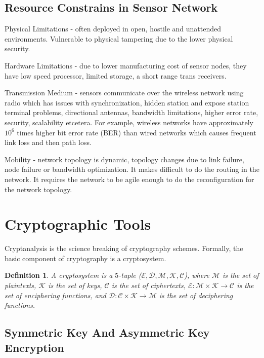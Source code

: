 \documentclass[%
  slidesonly,%
  semlayer%
  ]{seminar}                                  %
\newtheorem{definition}{Definition}[section]
\begin{document}
\begin{slide}
      \clearpage

  \subsection*{Resource Constrains in Sensor Network}
    Physical Limitations - often deployed in open, hostile and unattended environments. Vulnerable to physical tampering due to the lower physical security.

    Hardware Limitations - due to lower manufacturing cost of sensor nodes, they have low speed processor, limited storage, a short range trans receivers.

    Transmission Medium - sensors communicate over the wireless network using radio which has issues with synchronization, hidden station and expose station terminal problems, directional antennas, bandwidth limitations, higher error rate, security, scalability etcetera.
    For example, wireless networks have approximately $10^6$ times higher bit error rate (BER) than wired networks which causes frequent link loss and then path loss.

    Mobility - network topology is dynamic, topology changes due to link failure, node failure or bandwidth optimization.
    It makes difficult to do the routing in the network.
    It requires the network to be agile enough to do the reconfiguration for the network topology. 

    \clearpage

\section*{Cryptographic Tools}
  Cryptanalysis is the science breaking of cryptography schemes.
  Formally, the basic component of cryptography is a cryptosystem.
  \begin{definition}
    A cryptosystem is a $5$-tuple ($ \mathcal{E,D,M,K,C}$), where $\mathcal{M}$ is the set of \textit{plaintexts}, $\mathcal{K}$ is the set of \textit{keys}, $\mathcal{C}$ is the set of \textit{ciphertexts}, $\mathcal{E}:\mathcal{M} \times \mathcal{K} \rightarrow \mathcal{C}$ is the set of \textit{enciphering functions}, and $\mathcal{D}:\mathcal{C} \times \mathcal{K} \rightarrow \mathcal{M}$ is the set of \textit{deciphering functions}.
  \end{definition}
  \clearpage

  \subsection*{Symmetric Key And Asymmetric Key Encryption}


\end{slide}
\end{document}
